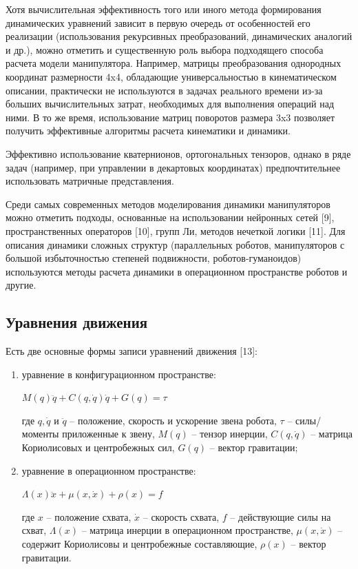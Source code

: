 Хотя вычислительная эффективность того или иного метода формирования динамических уравнений зависит в первую очередь от особенностей его реализации (использования рекурсивных преобразований, динамических аналогий и др.), можно отметить и существенную роль выбора подходящего способа расчета модели манипулятора. Например, матрицы преобразования однородных координат размерности 4x4, обладающие универсальностью в кинематическом описании, практически не используются в задачах реального времени из-за больших вычислительных затрат, необходимых для выполнения операций над ними. В то же время, использование матриц поворотов размера 3x3 позволяет получить эффективные алгоритмы расчета кинематики и динамики. 

Эффективно использование кватернионов, ортогональных тензоров, однако в ряде задач (например, при управлении в декартовых координатах) предпочтительнее использовать матричные представления.

Среди самых современных методов моделирования динамики манипуляторов можно отметить подходы, основанные на использовании нейронных  сетей [9], пространственных операторов [10], групп Ли, методов нечеткой логики [11]. Для описания динамики сложных структур (параллельных роботов, манипуляторов с большой избыточностью степеней подвижности, роботов-гуманоидов) используются методы расчета динамики в операционном пространстве роботов и другие.

\subsection{Уравнения движения}

Есть две основные формы записи уравнений движения [13]:

\begin{enumerate}
	\item уравнение в конфигурационном пространстве:
\begin{center}
	$M(q) \ddot q + C(q, \dot q)\dot q + G (q) = \tau$	
\end{center}
где $q, \dot q$ и $\ddot q$ -- положение, скорость и ускорение звена робота, $\tau$ -- силы/моменты приложенные к звену, $M(q)$ -- тензор инерции, $C(q, \dot q)$ -- матрица Кориолисовых и центробежных сил, $G(q)$ -- вектор гравитации;

	\item уравнение в операционном пространстве:
\begin{center}
	$\Lambda(x) \ddot x + \mu (x, \dot x) + \rho (x) = f$
\end{center}		
где $x$ -- положение схвата, $\dot x$ -- скорость схвата, $f$ -- действующие силы на схват, $\Lambda(x)$ -- матрица инерции в операционном пространстве, $\mu(x, \dot x)$ -- содержит Кориолисовы и центробежные составляющие, $\rho(x)$ -- вектор гравитации.

\end{enumerate}

